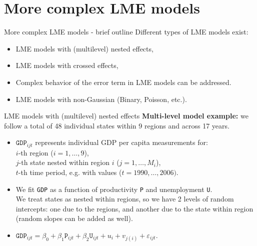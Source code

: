 \documentclass{beamer}
\begin{document}
\section{More complex LME models}
\begin{frame}{More complex LME models - brief outline}
Different types of LME models exist:\\
\bigskip
\begin{itemize}
\item LME models with (multilevel) nested effects,
\medskip
\item LME models with crossed effects,
\medskip
\item Complex behavior of the error term in LME models can be addressed.
\medskip
\item LME models with non-Gaussian (Binary, Poisson, etc.).
\end{itemize}
\end{frame}
\begin{frame}{LME models with (multilevel) nested effects}
\textbf{Multi-level model example:} we follow a total of 48 individual states within 9 regions and across 17 years.
\medskip
\begin{itemize}
\item $\texttt{GDP}_{ijt}$ represents individual GDP per capita measurements for:\\
\smallskip
$i$-th region ($i=1,\dots,9$),\\
$j$-th state nested within region $i$ ($j=1,\dots,M_i$),\\
$t$-th time period, e.g. with values ($t= 1990, \dots, 2006)$.\\

\medskip
\item We fit \texttt{GDP} as a function of productivity \texttt{P} and unemployment \texttt{U}.\\
\smallskip
We treat states as nested within regions, so we have 2 levels of random intercepts: one due to the regions, and another due to the state within region (random slopes can be added as well).
\bigskip
\item $\texttt{GDP}_{ijt} = \beta_0 + \beta_1 \texttt{P}_{ijt} 
+ \beta_2 \texttt{U}_{ijt} + u_i + v_{j(i)} + \varepsilon_{ijt}.$
\end{itemize}
\end{frame}
\end{document}
